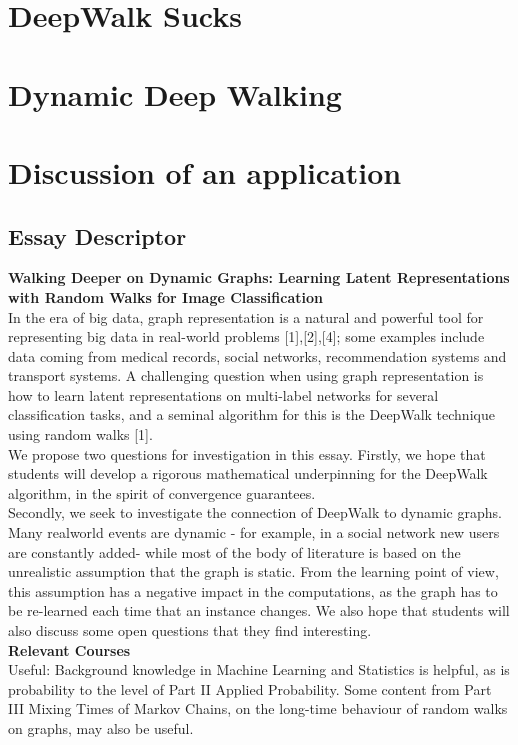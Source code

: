 \documentclass[a4paper]{article}
\begin{document}
\section{DeepWalk Sucks}
\section{Dynamic Deep Walking}
\section{Discussion of an application}
\subsection*{Essay Descriptor}
\textbf{Walking Deeper on Dynamic Graphs: Learning Latent Representations
with Random Walks for Image Classification}\\
In the era of big data, graph representation is a natural and powerful tool for representing big
data in real-world problems [1],[2],[4]; some examples include data coming from medical records,
social networks, recommendation systems and transport systems. A challenging question when
using graph representation is how to learn latent representations on multi-label networks for
several classification tasks, and a seminal algorithm for this is the DeepWalk technique using
random walks [1].\\
We propose two questions for investigation in this essay. Firstly, we hope that students will
develop a rigorous mathematical underpinning for the DeepWalk algorithm, in the spirit of
convergence guarantees.\\
Secondly, we seek to investigate the connection of DeepWalk to dynamic graphs. Many realworld events are dynamic - for example, in a social network new users are constantly added- while
most of the body of literature is based on the unrealistic assumption that the graph is static.
From the learning point of view, this assumption has a negative impact in the computations, as the graph has to be re-learned each time that an instance changes. We also hope that students
will also discuss some open questions that they find interesting.\\
\textbf{Relevant Courses}\\
Useful: Background knowledge in Machine Learning and Statistics is helpful, as is probability
to the level of Part II Applied Probability. Some content from Part III Mixing Times of Markov
Chains, on the long-time behaviour of random walks on graphs, may also be useful.\\
\end{document}

